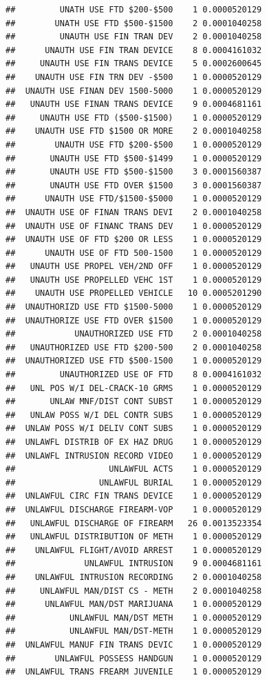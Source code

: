 \documentclass[]{book}
\begin{document}
\begin{verbatim}
##         UNATH USE FTD $200-$500    1 0.0000520129
##        UNATH USE FTD $500-$1500    2 0.0001040258
##         UNAUTH USE FIN TRAN DEV    2 0.0001040258
##      UNAUTH USE FIN TRAN DEVICE    8 0.0004161032
##     UNAUTH USE FIN TRANS DEVICE    5 0.0002600645
##    UNAUTH USE FIN TRN DEV -$500    1 0.0000520129
##  UNAUTH USE FINAN DEV 1500-5000    1 0.0000520129
##   UNAUTH USE FINAN TRANS DEVICE    9 0.0004681161
##     UNAUTH USE FTD ($500-$1500)    1 0.0000520129
##    UNAUTH USE FTD $1500 OR MORE    2 0.0001040258
##        UNAUTH USE FTD $200-$500    1 0.0000520129
##       UNAUTH USE FTD $500-$1499    1 0.0000520129
##       UNAUTH USE FTD $500-$1500    3 0.0001560387
##       UNAUTH USE FTD OVER $1500    3 0.0001560387
##      UNAUTH USE FTD/$1500-$5000    1 0.0000520129
##  UNAUTH USE OF FINAN TRANS DEVI    2 0.0001040258
##  UNAUTH USE OF FINANC TRANS DEV    1 0.0000520129
##  UNAUTH USE OF FTD $200 OR LESS    1 0.0000520129
##      UNAUTH USE OF FTD 500-1500    1 0.0000520129
##   UNAUTH USE PROPEL VEH/2ND OFF    1 0.0000520129
##   UNAUTH USE PROPELLED VEHC 1ST    1 0.0000520129
##    UNAUTH USE PROPELLED VEHICLE   10 0.0005201290
##  UNAUTHORIZD USE FTD $1500-5000    1 0.0000520129
##  UNAUTHORIZE USE FTD OVER $1500    1 0.0000520129
##            UNAUTHORIZED USE FTD    2 0.0001040258
##   UNAUTHORIZED USE FTD $200-500    2 0.0001040258
##  UNAUTHORIZED USE FTD $500-1500    1 0.0000520129
##         UNAUTHORIZED USE OF FTD    8 0.0004161032
##   UNL POS W/I DEL-CRACK-10 GRMS    1 0.0000520129
##       UNLAW MNF/DIST CONT SUBST    1 0.0000520129
##   UNLAW POSS W/I DEL CONTR SUBS    1 0.0000520129
##  UNLAW POSS W/I DELIV CONT SUBS    1 0.0000520129
##  UNLAWFL DISTRIB OF EX HAZ DRUG    1 0.0000520129
##  UNLAWFL INTRUSION RECORD VIDEO    1 0.0000520129
##                   UNLAWFUL ACTS    1 0.0000520129
##                 UNLAWFUL BURIAL    1 0.0000520129
##  UNLAWFUL CIRC FIN TRANS DEVICE    1 0.0000520129
##  UNLAWFUL DISCHARGE FIREARM-VOP    1 0.0000520129
##   UNLAWFUL DISCHARGE OF FIREARM   26 0.0013523354
##   UNLAWFUL DISTRIBUTION OF METH    1 0.0000520129
##    UNLAWFUL FLIGHT/AVOID ARREST    1 0.0000520129
##              UNLAWFUL INTRUSION    9 0.0004681161
##    UNLAWFUL INTRUSION RECORDING    2 0.0001040258
##     UNLAWFUL MAN/DIST CS - METH    2 0.0001040258
##      UNLAWFUL MAN/DST MARIJUANA    1 0.0000520129
##           UNLAWFUL MAN/DST METH    1 0.0000520129
##           UNLAWFUL MAN/DST-METH    1 0.0000520129
##  UNLAWFUL MANUF FIN TRANS DEVIC    1 0.0000520129
##        UNLAWFUL POSSESS HANDGUN    1 0.0000520129
##  UNLAWFUL TRANS FREARM JUVENILE    1 0.0000520129

\end{verbatim}
\end{document}
